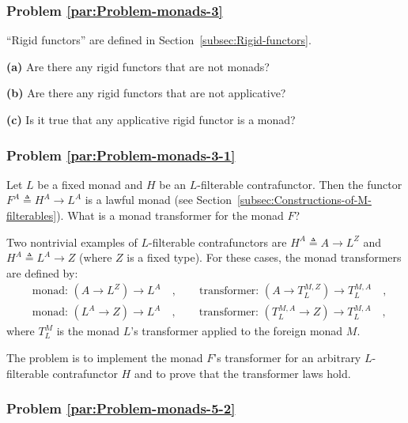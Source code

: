 \subsubsection{Problem \label{par:Problem-monads-3}\ref{par:Problem-monads-3}}

\textsf{``}Rigid functors\textsf{''} are defined
in Section~\ref{subsec:Rigid-functors}.

\textbf{(a)} Are there any rigid functors that are not monads? 

\textbf{(b)} Are there any rigid functors that are not applicative?

\textbf{(c)} Is it true that any applicative rigid functor is a monad?

\subsubsection{Problem \label{par:Problem-monads-3-1}\ref{par:Problem-monads-3-1}}

Let $L$ be a fixed monad and $H$ be an $L$-filterable contrafunctor.
Then the functor $F^{A}\triangleq H^{A}\rightarrow L^{A}$ is a lawful
monad (see Section~\ref{subsec:Constructions-of-M-filterables}).
What is a monad transformer for the monad $F$? 

Two nontrivial examples of $L$-filterable contrafunctors are $H^{A}\triangleq A\rightarrow L^{Z}$
and $H^{A}\triangleq L^{A}\rightarrow Z$ (where $Z$ is a fixed type).
For these cases, the monad transformers are defined by:
\begin{align*}
 & \text{monad: }(A\rightarrow L^{Z})\rightarrow L^{A}\quad,\quad\quad\text{transformer: }(A\rightarrow T_{L}^{M,Z})\rightarrow T_{L}^{M,A}\quad,\\
 & \text{monad: }(L^{A}\rightarrow Z)\rightarrow L^{A}\quad,\quad\quad\text{transformer: }(T_{L}^{M,A}\rightarrow Z)\rightarrow T_{L}^{M,A}\quad,
\end{align*}
where $T_{L}^{M}$ is the monad $L$\textsf{'}s transformer applied to the
foreign monad $M$.

The problem is to implement the monad $F$\textsf{'}s transformer for an arbitrary
$L$-filterable contrafunctor $H$ and to prove that the transformer
laws hold.

\subsubsection{Problem \label{par:Problem-monads-5-2}\ref{par:Problem-monads-5-2}}


